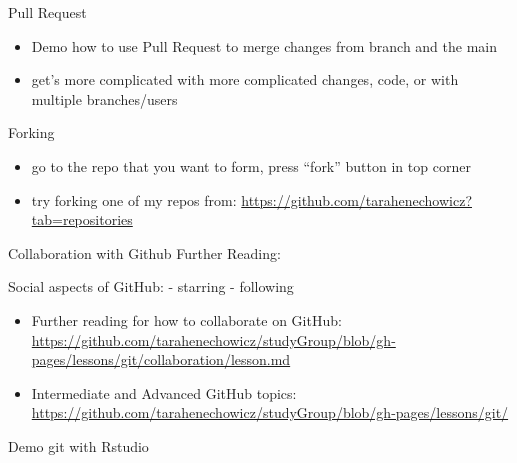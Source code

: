 \documentclass[ignorenonframetext,]{beamer}
\providecommand{\tightlist}{%
  \setlength{\itemsep}{0pt}\setlength{\parskip}{0pt}}
\begin{document}
\begin{frame}{Pull Request}

\begin{itemize}
\tightlist
\item
  Demo how to use Pull Request to merge changes from branch and the main
\item
  get's more complicated with more complicated changes, code, or with
  multiple branches/users
\end{itemize}

\end{frame}

\begin{frame}{Forking}

\begin{itemize}
\tightlist
\item
  go to the repo that you want to form, press ``fork'' button in top
  corner
\item
  try forking one of my repos from:
  \url{https://github.com/tarahenechowicz?tab=repositories}
\end{itemize}

\end{frame}

\begin{frame}{Collaboration with Github Further Reading:}

Social aspects of GitHub: - starring - following

\begin{itemize}
\item
  Further reading for how to collaborate on GitHub:
  \url{https://github.com/tarahenechowicz/studyGroup/blob/gh-pages/lessons/git/collaboration/lesson.md}
\item
  Intermediate and Advanced GitHub topics:
  \url{https://github.com/tarahenechowicz/studyGroup/blob/gh-pages/lessons/git/}
\end{itemize}

\end{frame}

\begin{frame}{Demo git with Rstudio}

\end{frame}
\end{document}

